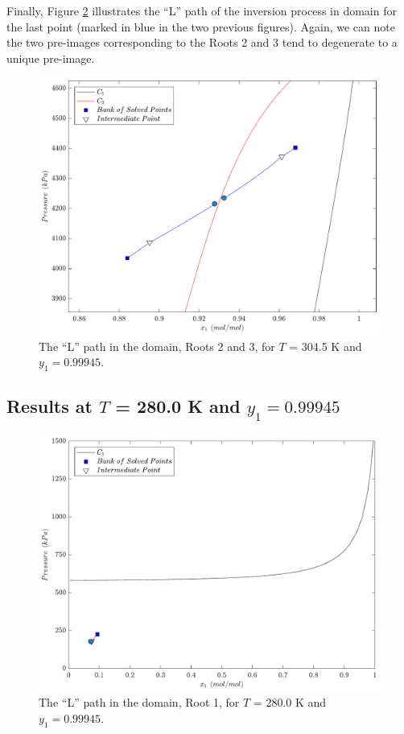 \documentclass[journal=iecred,manuscript=article]{achemso}
\theoremstyle{definition}
\theoremstyle{remark}
\begin{document}
Finally, Figure \ref{fig:L_S} illustrates the ``L'' path of the inversion process in domain for the last point (marked in blue in the two previous figures). Again, we can note the two pre-images corresponding to the Roots 2 and 3 tend to degenerate to a unique pre-image.

\begin{figure}
	\begin{center}
		\includegraphics[scale=0.50]{caminhos_L_degeneracao_dominio2.pdf}
		\caption{The ``L'' path in the domain, Roots 2 and 3, for $T$ = 304.5 K and $y_1 = 0.99945$.}\label{fig:L_S}
	\end{center}
\end{figure}

\subsection{Results at $T$ = 280.0 K and $y_1 = 0.99945$}

\begin{figure}
	\begin{center}
		\includegraphics[scale=0.50]{caminhos_L_degeneracao_dominio3.pdf}
		\caption{The ``L'' path in the domain, Root 1, for $T$ = 280.0 K and $y_1 = 0.99945$.}\label{fig:L_S}
	\end{center}
\end{figure}
\end{document}
